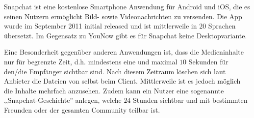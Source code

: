 Snapchat ist eine kostenlose Smartphone Anwendung f\"ur Android und iOS, die es
seinen Nutzern erm\"oglicht Bild- sowie Videonachrichten zu versenden. Die App
wurde im September 2011 initial released und ist mittlerweile in $20$ Sprachen
\"ubersetzt. Im Gegensatz zu YouNow gibt es f\"ur Snapchat keine
Desktopvariante.

Eine Besonderheit gegen\"uber anderen Anwendungen ist, dass die Medieninhalte
nur f\"ur begrenzte Zeit, d.h. mindestens eine und maximal $10$ Sekunden
f\"ur den/die Empf\"anger sichtbar sind. Nach diesem Zeitraum l\"oschen sich
laut Anbieter die Dateien von selbst beim Client. Mittlerweile ist es jedoch
m\"oglich die Inhalte mehrfach anzusehen. Zudem kann ein Nutzer eine sogenannte
,,Snapchat-Geschichte'' anlegen, welche $24$ Stunden sichtbar und mit
bestimmten Freunden oder der gesamten Community teilbar ist.

